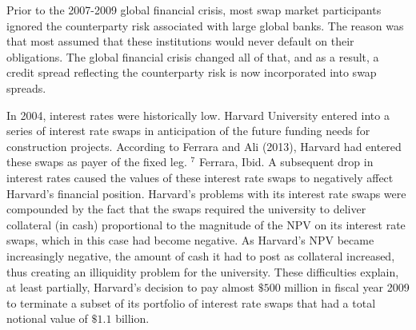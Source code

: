 \documentclass[11pt]{article}
\begin{document}
Prior to the 2007-2009 global financial crisis, most swap market participants ignored the counterparty risk associated with large global banks. The reason was that most assumed that these institutions would never default on their obligations. The global financial crisis changed all of that, and as a result, a credit spread reflecting the counterparty risk is now incorporated into swap spreads.

In 2004, interest rates were historically low. Harvard University entered into a series of interest rate swaps in anticipation of the future funding needs for construction projects. According to Ferrara and Ali (2013), Harvard had entered these swaps as payer of the fixed leg. ${ }^{7}$ Ferrara, Ibid. A subsequent drop in interest rates caused the values of these interest rate swaps to negatively affect Harvard's financial position. Harvard's problems with its interest rate swaps were compounded by the fact that the swaps required the university to deliver collateral (in cash) proportional to the magnitude of the NPV on its interest rate swaps, which in this case had become negative. As Harvard's NPV became increasingly negative, the amount of cash it had to post as collateral increased, thus creating an illiquidity problem for the university. These difficulties explain, at least partially, Harvard's decision to pay almost $\$ 500$ million in fiscal year 2009 to terminate a subset of its portfolio of interest rate swaps that had a total notional value of $\$ 1.1$ billion.
\end{document}
